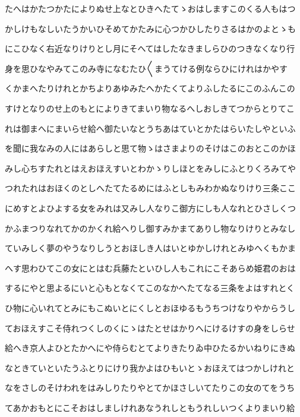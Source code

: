 \documentclass[a4paper,11pt,landscape]{ltjtarticle}
\begin{document}
\par\medskip
たへはかたつかたによりぬせ上なとひきへたてゝおはしますこのくる人もはつ
\par\medskip
かしけもなしいたうかいひそめてかたみに心つかひしたりさるはかのよとゝも
\par\medskip
にこひなく右近なりけりとし月にそへてはしたなきましらひのつきなくなり行
\par\medskip
身を思ひなやみてこのみ寺になむたひ〱まうてける例ならひにけれはかやす
\par\medskip
くかまへたりけれとかちよりあゆみたへかたくてよりふしたるにこのふんこの
\par\medskip
すけとなりのせ上のもとによりきてまいり物なるへしおしきてつからとりてこ
\par\medskip
れは御まへにまいらせ給へ御たいなとうちあはていとかたはらいたしやといふ
\par\medskip
を聞に我なみの人にはあらしと思て物ゝはさまよりのそけはこのおとこのかほ
\par\medskip
みし心ちすたれとはえおほえすいとわかゝりしほとをみしにふとりくろみてや
\par\medskip
つれたれはおほくのとしへたてたるめにはふとしもみわかぬなりけり三条ここ
\par\medskip
にめすとよひよする女をみれは又みし人なりこ御方にしも人なれとひさしくつ
\par\medskip
かふまつりなれてかのかくれ給へりし御すみかまてありし物なりけりとみなし
\par\medskip
ていみしく夢のやうなりしうとおほしき人はいとゆかしけれとみゆへくもかま
\par\medskip
へす思わひてこの女にとはむ兵藤たといひし人もこれにこそあらめ姫君のおは
\par\medskip
するにやと思よるにいと心もとなくてこのなかへたてなる三条をよはすれとく
\par\medskip
ひ物に心いれてとみにもこぬいとにくしとおほゆるもうちつけなりやからうし
\par\medskip
ておほえすこそ侍れつくしのくにゝはたとせはかりへにけるけすの身をしらせ
\par\medskip
給へき京人よひとたかへにや侍らむとてよりきたりゐ中ひたるかいねりにきぬ
\par\medskip
なときていといたうふとりにけり我かよはひもいとゝおほえてはつかしけれと
\par\medskip
なをさしのそけわれをはみしりたりやとてかほさしいてたりこの女のてをうち
\par\medskip
てあかおもとにこそおはしましけれあなうれしともうれしいつくよりまいり給
\end{document}
